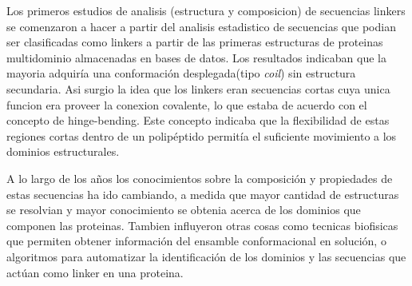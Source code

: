 Los primeros estudios de analisis (estructura y composicion) de secuencias linkers\cite{argos1990investigation} se comenzaron a hacer a partir del analisis estadistico de secuencias que podian ser clasificadas 
como linkers a partir de las primeras estructuras de proteinas multidominio almacenadas en bases de datos.
Los resultados indicaban que la mayoria adquiría una conformación desplegada(tipo \textit{coil}) sin estructura secundaria. 
Asi surgio la idea que los linkers eran secuencias cortas cuya unica funcion era proveer la conexion covalente, lo que estaba de acuerdo con el concepto de hinge-bending.
Este concepto indicaba que la flexibilidad de estas regiones cortas dentro de un polipéptido permitía el suficiente movimiento a los dominios estructurales.

% 


A lo largo de los años los conocimientos sobre la composición y propiedades de estas secuencias ha ido cambiando, 
a medida que mayor cantidad de estructuras se resolvian y mayor conocimiento se obtenia acerca de los dominios que componen 
las proteinas. Tambien influyeron otras cosas como tecnicas biofisicas que permiten obtener información del ensamble conformacional en solución,
o algoritmos para automatizar la identificación de los dominios y las secuencias que actúan como linker en una proteina.


